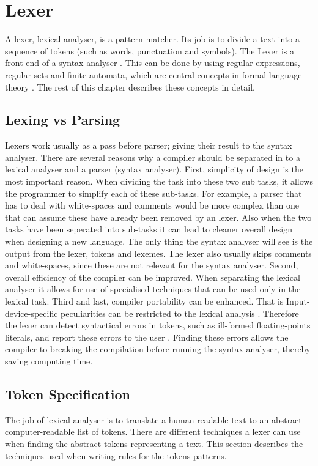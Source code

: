 \chapter{Lexer}
A lexer, lexical analyser, is a pattern matcher. Its job is to divide a text into a sequence of tokens (such as words, punctuation and symbols). The Lexer is a front end of a syntax 
analyser \cite{sebesta2012}.
This can be done by using regular expressions, regular sets and finite
automata, which are central concepts in formal language theory \cite{Aho1990}.
The rest of this chapter describes these concepts in detail.

\section{Lexing vs Parsing}
Lexers work usually as a pass before parser; giving their result to the syntax 
analyser.
There are several reasons why a compiler should be separated in to a lexical 
analyser and a parser (syntax analyser). First, simplicity of design is the most
important reason. When dividing the task into these two sub tasks, it allows the
programmer to simplify each of these sub-tasks. For example, a parser that has to 
deal with white-spaces and comments would be more complex 
than one that can assume these have already been removed by 
an lexer. Also when the two tasks have been seperated into sub-tasks it can lead to 
cleaner overall design when designing a new language.
The only thing the syntax analyser will see is the output from the 
lexer, tokens and lexemes.
The lexer also usually skips comments and white-spaces, since these are not relevant 
for the syntax analyser.
Second, overall efficiency of the compiler can be improved. When separating the 
lexical analyser it allows for use of specialised techniques that can be used 
only in the lexical task.
Third and last, compiler portability can be enhanced. That is Input-device-specific 
peculiarities can be restricted to the lexical analysis \cite{Aho2006}.
Therefore the lexer can detect syntactical errors in tokens, such as ill-formed 
floating-points literals, and report these errors to the user \cite{sebesta2012}.
Finding these errors allows the compiler to breaking the compilation before
running the syntax analyser, thereby saving computing time. 
\section{Token Specification}
The job of lexical analyser is to translate a human readable text to an abstract 
computer-readable list of tokens. There are different techniques a lexer can
use when finding the abstract tokens representing a text. This section describes the
techniques used when writing rules for the tokens patterns. 
